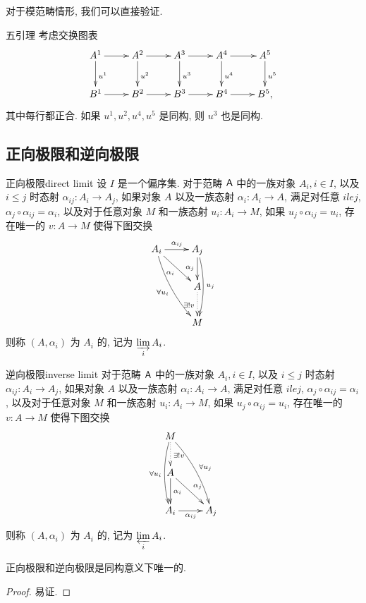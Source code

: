 对于模范畴情形, 我们可以直接验证.

\begin{corollary}{五引理}{}
考虑交换图表
  \[\xymatrix{
    A^1\ar[r]\ar[d]^{u^1}&A^2\ar[r]\ar[d]^{u^2}&
    A^3\ar[r]\ar[d]^{u^3}&A^4\ar[r]\ar[d]^{u^4}&
    A^5\ar[d]^{u^5}\\
    B^1\ar[r]&B^2\ar[r]&B^3\ar[r]&B^4\ar[r]&B^5,
  }\]
其中每行都正合. 如果 $u^1,u^2,u^4,u^5$ 是同构, 则 $u^3$ 也是同构.
\end{corollary}


\subsection{正向极限和逆向极限}

\begin{definition}{正向极限}{direct limit}
设 $I$ 是一个偏序集.
对于范畴 ${\mathsf{A}}$ 中的一族对象 $A_i,i\in I$, 以及 $i
\le j$ 时态射 $\alpha_{ij}:A_i\to A_j$, 如果对象 $A$ 以及一族态射 $\alpha_i:A_i\to A$, 满足对任意 $i
le j$, $\alpha_j\circ\alpha_{ij}=\alpha_i$, 以及对于任意对象 $M$ 和一族态射 $u_i:A_i\to M$, 如果 $u_j\circ \alpha_{ij}=u_i$, 存在唯一的 $v:A\to M$ 使得下图交换
  \[\xymatrix{
A_i\ar[r]^{\alpha_{ij}}\ar[rd]_{\alpha_i}\ar@/_/[rdd]_{\forall u_i}&A_j\ar[d]_{\alpha_j}\ar@/^/[dd]^{u_j}\\
&A\ar@{.>}_{\exists ! v}[d]\\
&M
}\]
则称 $(A,\alpha_i)$ 为 $A_i$ 的, 记为 $\varinjlim\limits_i A_i$.
\end{definition}

\begin{definition}{逆向极限}{inverse limit}
对于范畴 ${\mathsf{A}}$ 中的一族对象 $A_i,i\in I$, 以及 $i
\le j$ 时态射 $\alpha_{ij}:A_i\to A_j$, 如果对象 $A$ 以及一族态射 $\alpha_i:A_i\to A$, 满足对任意 $i
le j$, $\alpha_j\circ\alpha_{ij}=\alpha_i$, 以及对于任意对象 $M$ 和一族态射 $u_i:A_i\to M$, 如果 $u_j\circ \alpha_{ij}=u_i$, 存在唯一的 $v:A\to M$ 使得下图交换
  \[\xymatrix{
M\ar@/_/[dd]_{\forall u_i}\ar@/^/[rdd]^{\forall u_j}\ar@{.>}[d]^{\exists ! v}&\\
A\ar[d]^{\alpha_i}\ar[rd]^{\alpha_j}&\\
A_i\ar[r]_{\alpha_{ij}}&A_j
}\]
则称 $(A,\alpha_i)$ 为 $A_i$ 的, 记为 $\varprojlim\limits_i A_i$.
\end{definition}

\begin{proposition}{}{}
正向极限和逆向极限是同构意义下唯一的.
\end{proposition}
\begin{proof}
易证.
\end{proof}

